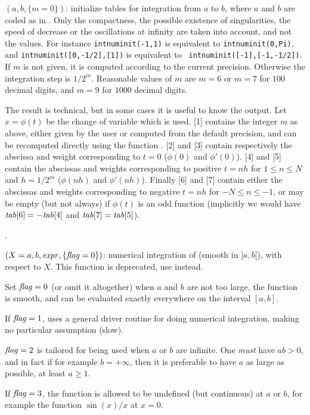 $(a,b,\{m=0\})$: initialize tables for integration from
$a$ to $b$, where $a$ and $b$ are coded as in . Only the
compactness, the possible existence of singularities, the speed of decrease
or the oscillations at infinity are taken into account, and not the values.
For instance {\tt intnuminit(-1,1)} is equivalent to {\tt intnuminit(0,Pi)},
and {\tt intnuminit([0,-1/2],[1])} is equivalent to {\tt
intnuminit([-1],[-1,-1/2])}. If $m$ is not given, it is computed according to
the current precision. Otherwise the integration step is $1/2^m$. Reasonable
values of $m$ are $m=6$ or $m=7$ for $100$ decimal digits, and $m=9$ for
$1000$ decimal digits.

The result is technical, but in some cases it is useful to know the output.
Let $x=\phi(t)$ be the change of variable which is used. [1] contains
the integer $m$ as above, either given by the user or computed from the default
precision, and can be recomputed directly using the function .
[2] and [3] contain respectively the abscissa and weight
corresponding to $t=0$ ($\phi(0)$ and $\phi'(0)$). [4] and
[5] contain the abscissas and weights corresponding to positive
$t=nh$ for $1\le n\le N$ and $h=1/2^m$ ($\phi(nh)$ and $\phi'(nh)$). Finally
[6] and [7] contain either the abscissas and weights
corresponding to negative $t=nh$ for $-N\le n\le -1$, or may be empty (but
not always) if $\phi(t)$ is an odd function (implicitly we would have
$\hbox{\it tab\/}[6]=-\hbox{\it tab\/}[4]$ and $\hbox{\it tab\/}[7]=\hbox{\it tab\/}[5]$).

.

$(X=a,b,\hbox{\it expr\/},\{\hbox{\it f\kern0pt lag\/}=0\})$: numerical integration of
 (smooth in $]a,b[$), with respect to $X$. This function is
deprecated, use  instead.

Set $\hbox{\it f\kern0pt lag\/}=0$ (or omit it altogether) when $a$ and $b$ are not too large, the
function is smooth, and can be evaluated exactly everywhere on the interval
$[a,b]$.

If $\hbox{\it f\kern0pt lag\/}=1$, uses a general driver routine for doing numerical integration,
making no particular assumption (slow).

$\hbox{\it f\kern0pt lag\/}=2$ is tailored for being used when $a$ or $b$ are infinite. One
\emph{must} have $ab>0$, and in fact if for example $b=+\infty$, then it is
preferable to have $a$ as large as possible, at least $a\ge1$.

If $\hbox{\it f\kern0pt lag\/}=3$, the function is allowed to be undefined (but continuous) at $a$
or $b$, for example the function $\sin(x)/x$ at $x=0$.

